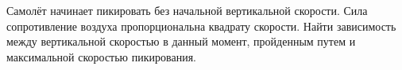 Самолёт начинает пикировать без начальной вертикальной скорости.
Сила сопротивление воздуха пропорциональна квадрату скорости. Найти
зависимость между вертикальной скоростью в данный момент, пройденным
путем и максимальной скоростью пикирования.
